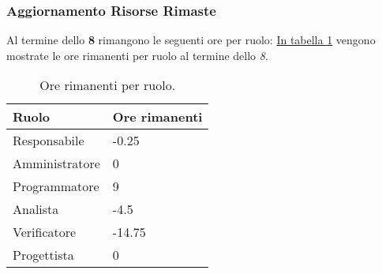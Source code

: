 \subsubsection{Aggiornamento Risorse Rimaste}
\label{sec:AggiornamentoRisorse_Sprint8}
Al termine dello \textbf{ 8} rimangono le seguenti ore per ruolo: \hyperref[tab:sprint8_ore_rimanenti]{In tabella \ref{tab:sprint8_ore_rimanenti}} vengono mostrate le ore rimanenti per ruolo al termine dello \textit{ 8}.

\begin{table}[H]
    \centering
    \begin{tabular}{| l | l |}
    \hline
    \textbf{Ruolo} & 
    \textbf{Ore rimanenti}\\
    \hline
        Responsabile & -0.25\\
    \hline
        Amministratore & 0\\
    \hline
        Programmatore & 9\\
    \hline
        Analista & -4.5\\
    \hline
        Verificatore & -14.75\\
    \hline
        Progettista & 0\\
    \hline
    \end{tabular}
    \caption{Ore rimanenti per ruolo.}
    \label{tab:sprint8_ore_rimanenti} 
\end{table}